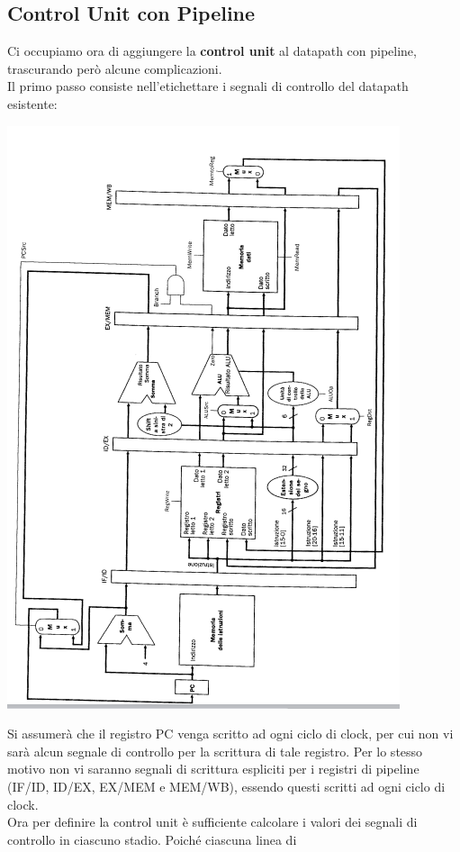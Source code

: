 \documentclass[a4paper,12pt, oneside]{book}
\begin{document}
\subsection{Control Unit con Pipeline}
Ci occupiamo ora di aggiungere la \textbf{control unit} al datapath
con pipeline, trascurando però alcune complicazioni.\\
Il primo passo consiste nell'etichettare i segnali di controllo del
datapath esistente:
\begin{center}
  \includegraphics[scale = 0.7]{img/pipec.png}
\end{center}
Si assumerà che il registro PC venga scritto ad ogni ciclo di clock,
per cui non vi sarà alcun segnale di controllo per la scrittura di
tale registro. Per lo stesso motivo non vi saranno segnali
di scrittura espliciti per i registri di pipeline
(IF/ID, ID/EX, EX/MEM e MEM/WB), essendo questi scritti ad ogni
ciclo di clock.\\
Ora per definire la control unit è sufficiente calcolare i valori dei
segnali di controllo in ciascuno stadio. Poiché ciascuna linea di
\end{document}
